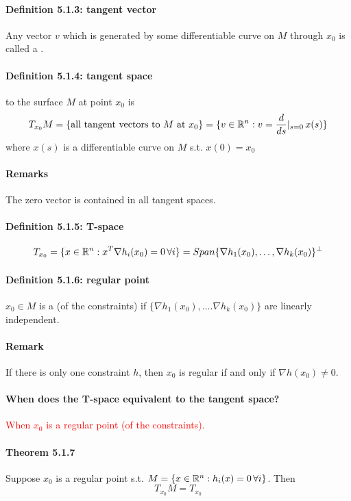 \documentclass[11pt]{article}
\begin{document}
\paragraph{Definition 5.1.3: tangent vector}
Any vector $v$ which is generated by some differentiable curve on $M$ through $x_0$ is called a .

\paragraph{Definition 5.1.4: tangent space}
 to the surface $M$ at point $x_0$ is
$$T_{x_0} M = \{ \text{all tangent vectors to $M$ at $x_0$} \} \\
= \{v \in \mathbb{R}^n: v = \frac{d}{ds} |_{s=0} \, x(s)\}$$
where $x(s)$ is a differentiable curve on $M$ s.t. $x(0) = x_0$

\paragraph{Remarks}
The zero vector is contained in all tangent spaces.

\paragraph{Definition 5.1.5: T-space}
$$T_{x_0} = \{ x\in \mathbb{R}^n: x^T \nabla h_i(x_0) = 0 \, \forall i\} = Span\{ \nabla h_1(x_0), \hdots, \nabla h_k(x_0)\}^\perp$$

\paragraph{Definition 5.1.6: regular point}
$x_0 \in M$ is a  (of the constraints) if $\{ \nabla h_1(x_0), \hdots. \nabla h_k(x_0) \}$ are linearly independent.
\paragraph{Remark}
If there is only one constraint $h$, then $x_0$ is regular if and only if $\nabla h(x_0) \neq 0$.

\paragraph{When does the T-space equivalent to the tangent space?}
\textcolor{red}{When $x_0$ is a regular point (of the constraints).}

\paragraph{Theorem 5.1.7}
Suppose $x_0$ is a regular point s.t. $ M = \{ x \in \mathbb{R}^n: h_i(x) = 0 \, \forall i\}$. Then
$$T_{x_0}M = T_{x_0}$$
\end{document}
